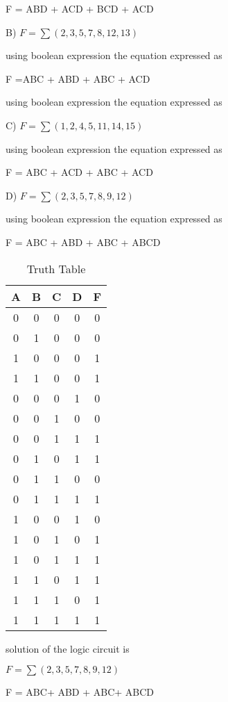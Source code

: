 \documentclass[journal,12pt,twocolumn]{IEEEtran}
\begin{document}
F = ABD + ACD + BCD + ACD 
\bigskip

B) $F = \sum(2,3,5,7,8,12,13)$
\bigskip

using boolean expression the equation expressed as 
\bigskip

F =ABC + ABD + ABC + ACD   
\bigskip

using boolean expression the equation expressed as
\bigskip

C) $F = \sum(1,2,4,5,11,14,15)$
\bigskip

using boolean expression the equation expressed as
\bigskip

F = ABC + ACD + ABC + ACD 
\bigskip

D) $F = \sum(2,3,5,7,8,9,12)$
\bigskip

using boolean expression the equation expressed as
\bigskip

F = ABC + ABD + ABC + ABCD 
\bigskip

\begin{table}[h]
    \setlength{\arrayrulewidth}{0.5mm}
\setlength{\tabcolsep}{18pt}
    \centering
\begin{tabular}{|c|c|c|c|c|}
  \hline
    \textbf A &\textbf B &\textbf C & \textbf D &\textbf F  \\
       \hline
     0&0&0&0&0 \\
     0&1&0&0&0 \\
     1&0&0&0&1 \\
     1&1&0&0&1 \\
     0&0&0&1&0 \\
     0&0&1&0&0 \\
     0&0&1&1&1 \\
     0&1&0&1&1 \\
     0&1&1&0&0 \\
     0&1&1&1&1 \\
     1&0&0&1&0 \\
     1&0&1&0&1 \\
     1&0&1&1&1 \\
     1&1&0&1&1 \\
     1&1&1&0&1 \\
     1&1&1&1&1 \\
       \hline
\end{tabular}
\caption{Truth Table}
\end{table}
\bigskip

\bigskip
 solution of the logic circuit is
\bigskip

$F = \sum(2,3,5,7,8,9,12)$
\bigskip

F = ABC+ ABD + ABC+ ABCD
\end{document}
